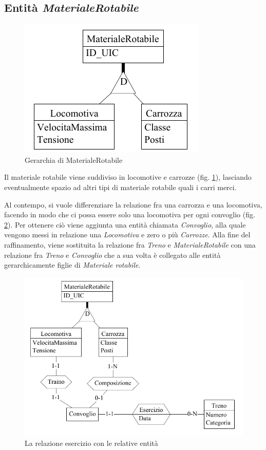 \documentclass[a4paper,12pt]{report}
\begin{document}
	\subsection{Entità \textit{MaterialeRotabile}}
	\begin{figure}[h]
		\begin{center}
			\includegraphics{res/schema/loco}
		\end{center}
		\caption{Gerarchia di MaterialeRotabile}
		\label{fig:loco}
	\end{figure}
	\par Il materiale rotabile viene suddiviso in locomotive e carrozze (fig. \ref{fig:loco}), lasciando eventualmente spazio ad altri tipi di materiale rotabile quali i carri merci.
	\par Al contempo, si vuole differenziare la relazione fra una carrozza e una locomotiva, facendo in modo che ci possa essere solo una locomotiva per ogni convoglio (fig. \ref{fig:esercizio}). Per ottenere ciò viene aggiunta una entità chiamata \textit{Convoglio}, alla quale vengono messi in relazione una \textit{Locomotiva} e zero o più \textit{Carrozze}. Alla fine del raffinamento, viene sostituita la relazione fra \textit{Treno} e \textit{MaterialeRotabile} con una relazione fra \textit{Treno} e \textit{Convoglio} che a sua volta è collegato alle entità gerarchicamente figlie di \textit{Materiale rotabile}.
	\begin{figure}[h!]
		\begin{center}
			\includegraphics[scale=0.75]{res/schema/esercizio}
		\end{center}
		\caption{La relazione esercizio con le relative entità}
		\label{fig:esercizio}
	\end{figure}
\end{document}
